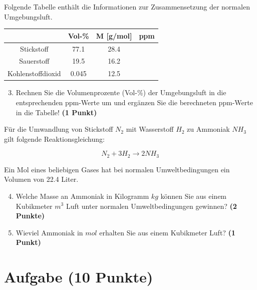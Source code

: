 \documentclass[a4paper, 9pt]{scrartcl}\usepackage[]{graphicx}\usepackage[]{xcolor}
\begin{document}
Folgende Tabelle enth{\"a}lt die Informationen zur Zusammensetzung der
normalen Umgebungsluft.

\begin{center}
  \begin{tabular}{ c|c|c|c }
     & Vol-\% & M [g/mol] & ppm \\
    \hline
    Stickstoff & 77.1 & 28.4 &
                                                    \phantom{1000000000000}\strut\\
        \hline
    Sauerstoff & 19.5 & 16.2 &
                                                    \phantom{10000000}\strut\\
        \hline
    Kohlenstoffdioxid & 0.045 & 12.5 & \phantom{10000000}\strut\\     
     \hline
\end{tabular}
\end{center}

\begin{enumerate}
   \setcounter{enumi}{2}
\item Rechnen Sie die Volumenprozente (Vol-\%) der Umgebungsluft in die
  entsprechenden ppm-Werte um und erg{\"a}nzen Sie die berechneten ppm-Werte in
  die Tabelle!  \textbf{(1 Punkt)}
\end{enumerate}

F{\"u}r die Umwandlung von Stickstoff $N_2$ mit Wasserstoff $H_2$ zu Ammoniak
$NH_3$ gilt folgende Reaktionsgleichung:

\begin{equation*}
  N_2 + 3H_2 \rightarrow 2NH_3
\end{equation*}  

Ein Mol eines beliebigen Gases hat bei normalen Umweltbedingungen ein
Volumen von 22.4 Liter. %

\begin{enumerate}
  \setcounter{enumi}{3}
\item Welche Masse an Ammoniak in Kilogramm $kg$ k{\"o}nnen Sie aus einem
  Kubikmeter $m^3$ Luft unter normalen Umweltbedingungen gewinnen?
  \textbf{(2 Punkte)}
\item Wieviel Ammoniak in $mol$ erhalten Sie aus einem Kubikmeter Luft?
  \textbf{(1 Punkt)}
\end{enumerate}

 
\clearpage

\section{Aufgabe \hfill (10 Punkte)}
\end{document}
